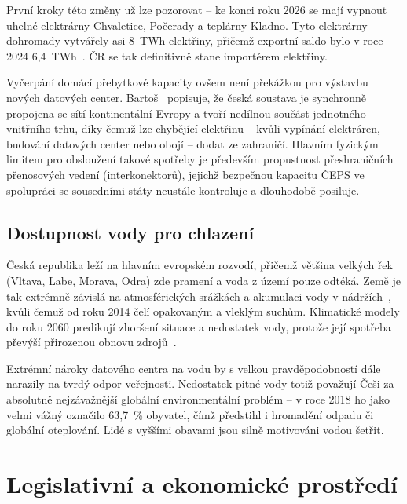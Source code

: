 První kroky této změny už lze pozorovat -- ke konci roku 2026 se mají vypnout uhelné elektrárny Chvaletice, Počerady a teplárny Kladno. Tyto elektrárny dohromady vytvářely asi 8~TWh elektřiny, přičemž exportní saldo bylo v roce 2024 6,4~TWh~\cite{chlubna_vypnuti_2025}. ČR se tak definitivně stane importérem elektřiny.

Vyčerpání domácí přebytkové kapacity ovšem není překážkou pro výstavbu nových datových center. Bartoš~\cite{bartos_energetika_2025} popisuje, že česká soustava je synchronně propojena se sítí kontinentální Evropy a tvoří nedílnou součást jednotného vnitřního trhu, díky čemuž lze chybějící elektřinu -- kvůli vypínání elektráren, budování datových center nebo obojí -- dodat ze zahraničí. Hlavním fyzickým limitem pro obsloužení takové spotřeby je především propustnost přeshraničních přenosových vedení (interkonektorů), jejichž bezpečnou kapacitu ČEPS ve spolupráci se sousedními státy neustále kontroluje a dlouhodobě posiluje.~\cite{bartos_energetika_2025}


\subsection{Dostupnost vody pro chlazení}
\label{subsec:cz_voda_dostupnost}

Česká republika leží na hlavním evropském rozvodí, přičemž většina velkých řek (Vltava, Labe, Morava, Odra) zde pramení a voda z území pouze odtéká. Země je tak extrémně závislá na atmosférických srážkách a akumulaci vody v nádržích~\cite{hornicek_water_2026}, kvůli čemuž od roku 2014 čelí opakovaným a vleklým suchům. Klimatické modely do roku 2060 predikují zhoršení situace a nedostatek vody, protože její spotřeba převýší přirozenou obnovu zdrojů~\cite{mullerova_water_2024}.

Extrémní nároky datového centra na vodu by s velkou pravděpodobností dále narazily na tvrdý odpor veřejnosti. Nedostatek pitné vody totiž považují Češi za absolutně nejzávažnější globální environmentální problém -- v roce 2018 ho jako velmi vážný označilo 63,7~\% obyvatel, čímž předstihl i hromadění odpadu či globální oteplování. Lidé s vyššími obavami jsou silně motivováni vodou šetřit.~\cite{hejdukova_water_2020}

\section{Legislativní a ekonomické prostředí}
\label{sec:cz_legislativa}

